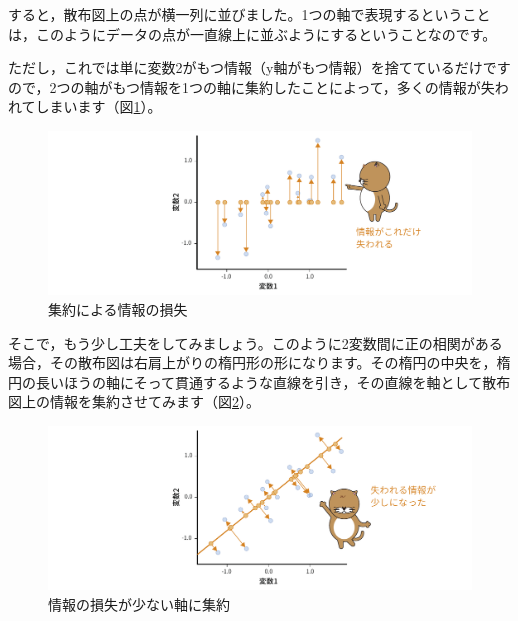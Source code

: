 \documentclass[
  12pt,
  a5jpaper,
  lualatex, ja=standard]{bxjsbook}
\begin{document}
すると，散布図上の点が横一列に並びました。1つの軸で表現するということは，このようにデータの点が一直線上に並ぶようにするということなのです。

ただし，これでは単に変数2がもつ情報（y軸がもつ情報）を捨てているだけですので，2つの軸がもつ情報を1つの軸に集約したことによって，多くの情報が失われてしまいます（図\ref{fig:factor-pca-scatter3}）。

\begin{figure}[!ht]

{\centering \includegraphics[width=1\linewidth]{images/factor/pca-scatter3} 

}

\caption{集約による情報の損失}\label{fig:factor-pca-scatter3}
\end{figure}

そこで，もう少し工夫をしてみましょう。このように2変数間に正の相関がある場合，その散布図は右肩上がりの楕円形の形になります。その楕円の中央を，楕円の長いほうの軸にそって貫通するような直線を引き，その直線を軸として散布図上の情報を集約させてみます（図\ref{fig:factor-pca-scatter4}）。

\begin{figure}[!ht]

{\centering \includegraphics[width=1\linewidth]{images/factor/pca-scatter4} 

}

\caption{情報の損失が少ない軸に集約}\label{fig:factor-pca-scatter4}
\end{figure}
\end{document}
